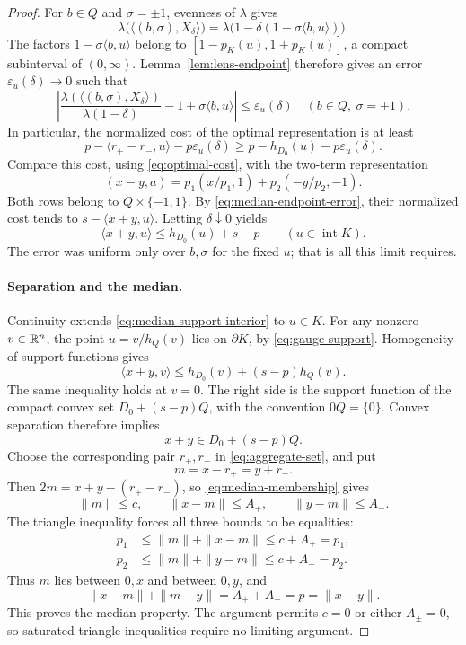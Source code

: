 \begin{proof}
For $b\in Q$ and $\sigma=\pm1$, evenness of $\lambda$ gives
\[
 \lambda\bigl(\langle(b,\sigma),X_\delta\rangle\bigr)
 =\lambda\bigl(1-\delta(1-\sigma\langle b,u\rangle)\bigr).
\]
The factors $1-\sigma\langle b,u\rangle$ belong to
$[1-p_K(u),1+p_K(u)]$, a compact subinterval of $(0,\infty)$.
Lemma~\ref{lem:lens-endpoint} therefore gives an error
$\varepsilon_u(\delta)\to0$ such that
\begin{equation}\label{eq:median-endpoint-error}
 \left|
 \frac{\lambda(\langle(b,\sigma),X_\delta\rangle)}
      {\lambda(1-\delta)}
       -1+\sigma\langle b,u\rangle
 \right|\le\varepsilon_u(\delta)
 \quad(b\in Q,\ \sigma=\pm1).
\end{equation}
In particular, the normalized cost of the optimal representation is
at least
\[
 p-\langle r_+-r_-,u\rangle-p\varepsilon_u(\delta)
 \ge p-h_{D_0}(u)-p\varepsilon_u(\delta).
\]
Compare this cost, using \eqref{eq:optimal-cost}, with the two-term
representation
\[
 (x-y,a)=p_1(x/p_1,1)+p_2(-y/p_2,-1).
\]
Both rows belong to $Q\times\{-1,1\}$. By
\eqref{eq:median-endpoint-error}, their normalized cost tends to
$s-\langle x+y,u\rangle$. Letting $\delta\downarrow0$ yields
\begin{equation}\label{eq:median-support-interior}
 \langle x+y,u\rangle\le h_{D_0}(u)+s-p
 \qquad(u\in\operatorname{int}K).
\end{equation}
The error was uniform only over $b,\sigma$ for the fixed $u$; that
is all this limit requires.

\paragraph{Separation and the median.}
Continuity extends \eqref{eq:median-support-interior} to $u\in K$.
For any nonzero $v\in\mathbb R^n$, the point
$u=v/h_Q(v)$ lies on $\partial K$, by \eqref{eq:gauge-support}.
Homogeneity of support functions gives
\[
 \langle x+y,v\rangle\le h_{D_0}(v)+(s-p)h_Q(v).
\]
The same inequality holds at $v=0$. The right side is the support
function of the compact convex set $D_0+(s-p)Q$, with the convention
$0Q=\{0\}$. Convex separation therefore implies
\begin{equation}\label{eq:median-membership}
 x+y\in D_0+(s-p)Q.
\end{equation}
Choose the corresponding pair $r_+,r_-$ in
\eqref{eq:aggregate-set}, and put
\[
 m=x-r_+=y+r_-.
\]
Then $2m=x+y-(r_+-r_-)$, so \eqref{eq:median-membership} gives
\[
 \|m\|\le c,\qquad
 \|x-m\|\le A_+,\qquad
 \|y-m\|\le A_-.
\]
The triangle inequality forces all three bounds to be equalities:
\[
 \begin{aligned}
 p_1&\le\|m\|+\|x-m\|\le c+A_+=p_1,\\
 p_2&\le\|m\|+\|y-m\|\le c+A_-=p_2.
 \end{aligned}
\]
Thus $m$ lies between $0,x$ and between $0,y$, and
\[
 \|x-m\|+\|m-y\|=A_++A_-=p=\|x-y\|.
\]
This proves the median property. The argument permits $c=0$ or either
$A_\pm=0$, so saturated triangle inequalities require no limiting
argument.
\end{proof}

